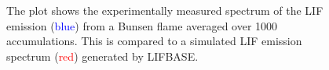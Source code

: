 \begin{figure}

\centering



\caption[Spectrum of the CH LIF emission]{The plot shows the experimentally measured spectrum of the LIF emission (\textcolor{blue}{blue}) from a Bunsen flame averaged over 1000 accumulations. This is compared to a simulated LIF emission spectrum (\textcolor{red}{red}) generated by LIFBASE.}

\label{fig:chPLIFSpectrum}

\end{figure}

